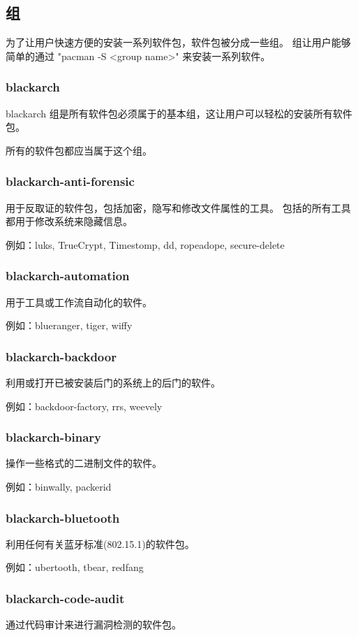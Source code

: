 \documentclass[a4paper, oneside, 11pt]{book}
\begin{document}
\subsection{组}
为了让用户快速方便的安装一系列软件包，软件包被分成一些组。
组让用户能够简单的通过 "pacman -S <group name>" 来安装一系列软件。

\subsubsection{blackarch}
blackarch 组是所有软件包必须属于的基本组，这让用户可以轻松的安装所有软件包。

所有的软件包都应当属于这个组。

\subsubsection{blackarch-anti-forensic}
用于反取证的软件包，包括加密，隐写和修改文件属性的工具。
包括的所有工具都用于修改系统来隐藏信息。

例如：luks, TrueCrypt, Timestomp, dd, ropeadope, secure-delete

\subsubsection{blackarch-automation}
用于工具或工作流自动化的软件。

例如：blueranger, tiger, wiffy

\subsubsection{blackarch-backdoor}
利用或打开已被安装后门的系统上的后门的软件。

例如：backdoor-factory, rrs, weevely

\subsubsection{blackarch-binary}
操作一些格式的二进制文件的软件。

例如：binwally, packerid

\subsubsection{blackarch-bluetooth}
利用任何有关蓝牙标准(802.15.1)的软件包。

例如：ubertooth, tbear, redfang

\subsubsection{blackarch-code-audit}
通过代码审计来进行漏洞检测的软件包。
\end{document}

